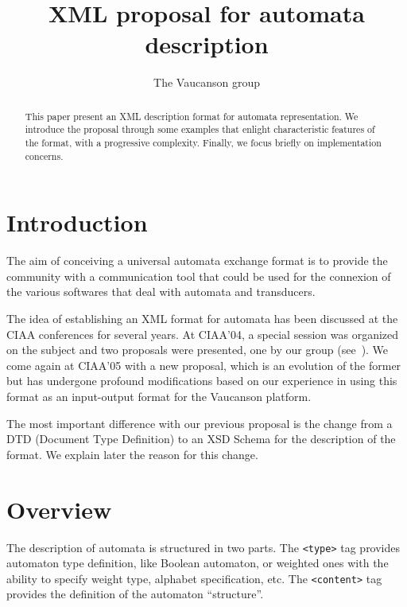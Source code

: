 \documentclass[a4paper]{article}
\newcommand{\Vauc}{{\sc Vaucanson}\xspace}
\begin{document}
\title{XML proposal for automata description}

\author{The \Vauc group}


\maketitle{}

\begin{abstract}
This paper present an XML description format for automata
representation. We introduce the proposal through some examples that
enlight characteristic features of the format, with a progressive
complexity. Finally, we focus briefly on implementation concerns.
\end{abstract}


\section{Introduction}

The aim of conceiving a universal automata exchange format is to
provide the community with a communication tool that could be used
for the connexion of the various softwares that deal with
automata and transducers.

The idea of establishing an XML format for automata has been
discussed at the CIAA conferences for several years.
At CIAA'04, a special session was organized on the subject and two
proposals were presented, one by our group (see~\cite{VXML04}).
We come again at CIAA'05 with a new proposal, which is an evolution of
the former but has undergone profound modifications based on our
experience in using this format as an input-output format
for the \Vauc platform.

The most important difference with our previous proposal is the change
from a DTD (Document Type Definition) to an XSD Schema for the
description of the format. 
We explain later the reason for this change.


\section{Overview}

The description of automata is structured in two parts.  The
\verb|<type>| tag provides automaton type definition, like Boolean
automaton, or weighted ones with the ability to specify weight type,
alphabet specification, etc. The \verb|<content>| tag provides the
definition of the automaton ``structure''.\\
\end{document}
